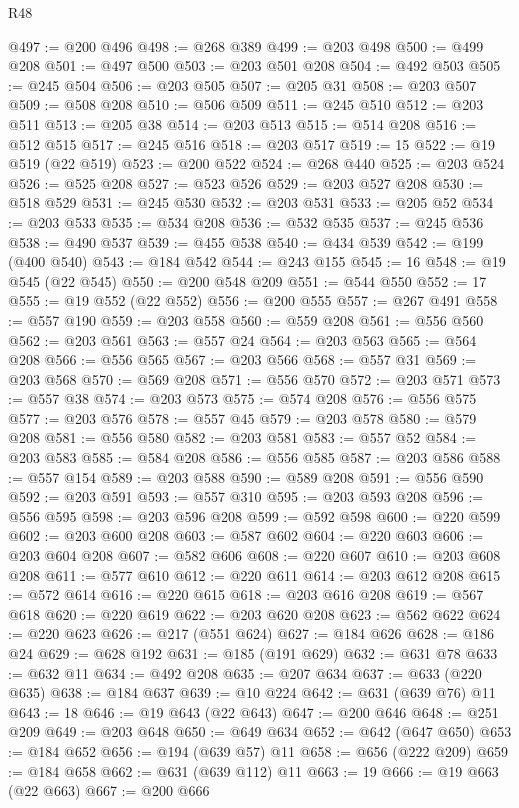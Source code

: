 \begin{lexlean}{R48}
\begin{coremodule}
@497 := @200 @496
@498 := @268 @389
@499 := @203 @498
@500 := @499 @208
@501 := @497 @500
@503 := @203 @501 @208
@504 := @492 @503
@505 := @245 @504
@506 := @203 @505
@507 := @205 @31
@508 := @203 @507
@509 := @508 @208
@510 := @506 @509
@511 := @245 @510
@512 := @203 @511
@513 := @205 @38
@514 := @203 @513
@515 := @514 @208
@516 := @512 @515
@517 := @245 @516
@518 := @203 @517
@519 := 15
@522 := @19 @519 (@22 @519)
@523 := @200 @522
@524 := @268 @440
@525 := @203 @524
@526 := @525 @208
@527 := @523 @526
@529 := @203 @527 @208
@530 := @518 @529
@531 := @245 @530
@532 := @203 @531
@533 := @205 @52
@534 := @203 @533
@535 := @534 @208
@536 := @532 @535
@537 := @245 @536
@538 := @490 @537
@539 := @455 @538
@540 := @434 @539
@542 := @199 (@400 @540)
@543 := @184 @542
@544 := @243 @155
@545 := 16
@548 := @19 @545 (@22 @545)
@550 := @200 @548 @209
@551 := @544 @550
@552 := 17
@555 := @19 @552 (@22 @552)
@556 := @200 @555
@557 := @267 @491
@558 := @557 @190
@559 := @203 @558
@560 := @559 @208
@561 := @556 @560
@562 := @203 @561
@563 := @557 @24
@564 := @203 @563
@565 := @564 @208
@566 := @556 @565
@567 := @203 @566
@568 := @557 @31
@569 := @203 @568
@570 := @569 @208
@571 := @556 @570
@572 := @203 @571
@573 := @557 @38
@574 := @203 @573
@575 := @574 @208
@576 := @556 @575
@577 := @203 @576
@578 := @557 @45
@579 := @203 @578
@580 := @579 @208
@581 := @556 @580
@582 := @203 @581
@583 := @557 @52
@584 := @203 @583
@585 := @584 @208
@586 := @556 @585
@587 := @203 @586
@588 := @557 @154
@589 := @203 @588
@590 := @589 @208
@591 := @556 @590
@592 := @203 @591
@593 := @557 @310
@595 := @203 @593 @208
@596 := @556 @595
@598 := @203 @596 @208
@599 := @592 @598
@600 := @220 @599
@602 := @203 @600 @208
@603 := @587 @602
@604 := @220 @603
@606 := @203 @604 @208
@607 := @582 @606
@608 := @220 @607
@610 := @203 @608 @208
@611 := @577 @610
@612 := @220 @611
@614 := @203 @612 @208
@615 := @572 @614
@616 := @220 @615
@618 := @203 @616 @208
@619 := @567 @618
@620 := @220 @619
@622 := @203 @620 @208
@623 := @562 @622
@624 := @220 @623
@626 := @217 (@551 @624)
@627 := @184 @626
@628 := @186 @24
@629 := @628 @192
@631 := @185 (@191 @629)
@632 := @631 @78
@633 := @632 @11
@634 := @492 @208
@635 := @207 @634
@637 := @633 (@220 @635)
@638 := @184 @637
@639 := @10 @224
@642 := @631 (@639 @76) @11
@643 := 18
@646 := @19 @643 (@22 @643)
@647 := @200 @646
@648 := @251 @209
@649 := @203 @648
@650 := @649 @634
@652 := @642 (@647 @650)
@653 := @184 @652
@656 := @194 (@639 @57) @11
@658 := @656 (@222 @209)
@659 := @184 @658
@662 := @631 (@639 @112) @11
@663 := 19
@666 := @19 @663 (@22 @663)
@667 := @200 @666

\end{coremodule}
\end{lexlean}
